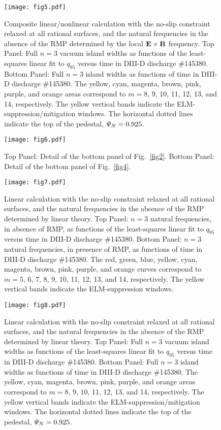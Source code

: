 \documentclass[12pt,prb,aps]{revtex4-1}
\begin{document}
\begin{figure}
\texttt{[image: fig5.pdf]}
\caption{Composite linear/nonlinear calculation with the no-slip constraint relaxed at all rational surfaces, and the natural frequencies
in the absence of the RMP determined by the local  ${\bf E}\times {\bf B}$
frequency. Top Panel: Full  $n=3$ vacuum island widths as functions of the least-squares linear fit to $q_{95}$ versus time 
in   DIII-D discharge \#145380.
Bottom Panel:  Full $n=3$ island widths as functions of time
in   DIII-D discharge \#145380. The yellow, cyan, magenta, brown, pink,
purple, and orange  areas correspond to $m=8$, 9, 10, 11, 12, 13, and 14, respectively. The yellow vertical bands indicate the ELM-suppression/mitigation windows. 
The horizontal dotted lines indicate the top of the pedestal, ${\mit\Psi}_N=0.925$.} \label{fig5}
\end{figure}

\begin{figure}
\texttt{[image: fig6.pdf]}
\caption{Top Panel: Detail of the bottom panel of Fig.~\ref{fig2}. Bottom Panel: Detail of the bottom panel of Fig.~\ref{fig4}. } \label{fig6}
\end{figure}

\begin{figure}
\texttt{[image: fig7.pdf]}
\caption{Linear calculation with the no-slip constraint relaxed at all rational surfaces, and  the natural frequencies
in the absence of the RMP determined by linear theory. 
 Top Panel: $n=3$ natural frequencies, in absence of RMP, as functions of the least-squares linear fit to $q_{95}$ versus time
in   DIII-D discharge \#145380.
Bottom Panel:  $n=3$ natural frequencies, in presence of RMP, as functions of time
in   DIII-D discharge \#145380. The red, green, blue, yellow, cyan, magenta, brown, pink,
purple, and orange  curves correspond to $m=5$, 6, 7, 8, 9, 10, 11, 12, 13, and 14, respectively. The yellow vertical bands indicate the ELM-suppression windows.} \label{fig7}
\end{figure}

\begin{figure}
\texttt{[image: fig8.pdf]}
\caption{Linear calculation with the no-slip constraint relaxed at all rational surfaces, and  the natural frequencies
in the absence of the RMP determined by linear theory. Top Panel: Full  $n=3$ vacuum island widths as functions of the least-squares linear fit to $q_{95}$ versus time 
in   DIII-D discharge \#145380.
Bottom Panel:  Full $n=3$ island widths as functions of time
in   DIII-D discharge \#145380. The yellow, cyan, magenta, brown, pink,
purple, and orange  areas correspond to $m=8$, 9, 10, 11, 12, 13, and 14, respectively. The yellow vertical bands indicate the ELM-suppression/mitigation windows. 
The horizontal dotted lines indicate the top of the pedestal, ${\mit\Psi}_N=0.925$.} \label{fig8}
\end{figure}
\end{document}
